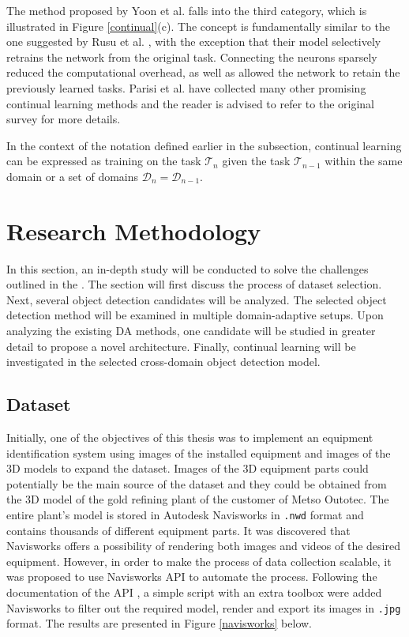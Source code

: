 \documentclass[english, 12pt, a4paper, elec, utf8, a-1b, online]{aaltothesis}
\begin{document}
The method proposed by Yoon et al. \cite{Yoon2017} falls into the third category, which is illustrated in Figure \ref{continual}(c). The concept is fundamentally similar to the one suggested by Rusu et al. \cite{Rusu2016}, with the exception that their model selectively retrains the network from the original task. Connecting the neurons sparsely reduced the computational overhead, as well as allowed the network to retain the previously learned tasks. Parisi et al. \cite{Parisi2018} have collected many other promising continual learning methods and the reader is advised to refer to the original survey for more details.   

In the context of the notation defined earlier in the  subsection, continual learning can be expressed as training on the task $\mathcal{T}_n$ given the task $\mathcal{T}_{n-1}$ within the same domain or a set of domains $\mathcal{D}_{n} = \mathcal{D}_{n-1}$.   



\clearpage 

\section{Research Methodology}
\label{Methodology}

In this section, an in-depth study will be conducted to solve the challenges outlined in the . The section will first discuss the process of dataset selection. Next, several object detection candidates will be analyzed.  The selected object detection method will be examined in multiple domain-adaptive setups. Upon analyzing the existing DA methods, one candidate will be studied in greater detail to propose a novel architecture. Finally, continual learning will be investigated in the selected cross-domain object detection model. 


\subsection{Dataset}
\label{datasets} 
Initially, one of the objectives of this thesis was to implement an equipment identification system using images of the installed equipment and images of the 3D models to expand the dataset. Images of the 3D equipment parts could potentially be the main source of the dataset and they could be obtained from the 3D model of the gold refining plant of the customer of Metso Outotec. The entire plant's model is stored in Autodesk Navisworks in \texttt{.nwd} format and contains thousands of different equipment parts. It was discovered that Navisworks offers a possibility of rendering both images and videos of the desired equipment. However, in order to make the process of data collection scalable, it was proposed to use Navisworks API to automate the process. Following the documentation of the API  \cite{navisworks}, a simple script with an extra toolbox were added Navisworks to filter out the required model, render and export its images in \texttt{.jpg} format. The results are presented in Figure \ref{navisworks} below.
\end{document}
